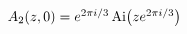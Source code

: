 $\mathop{A_{2}\/}\nolimits\!\left(z,0\right)=e^{2\pi i/3}\mathop{\mathrm{Ai}\/}%
\nolimits\!\left(ze^{2\pi i/3}\right)$